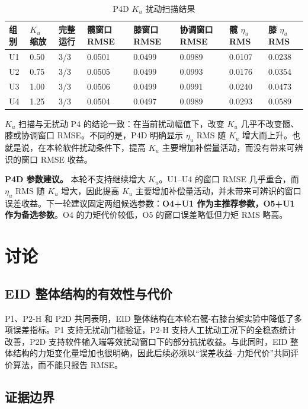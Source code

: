 \documentclass[12pt,a4paper]{ctexart}
\begin{document}
\begin{table}[htbp]
\centering
\footnotesize
\caption{P4D $K_u$ 扰动扫描结果}
\begin{tabularx}{\textwidth}{YYYYYYYY}
\toprule
组别 & $K_u$ 缩放 & 完整运行 & 髋窗口 RMSE & 膝窗口 RMSE & 协调窗口 RMSE & 髋 $\eta_u$ RMS & 膝 $\eta_u$ RMS \\
\midrule
U1 & 0.50 & 3/3 & 0.0501 & 0.0499 & 0.0989 & 0.0107 & 0.0238 \\
U2 & 0.75 & 3/3 & 0.0505 & 0.0499 & 0.0993 & 0.0176 & 0.0354 \\
U3 & 1.00 & 3/3 & 0.0506 & 0.0499 & 0.0991 & 0.0240 & 0.0473 \\
U4 & 1.25 & 3/3 & 0.0504 & 0.0497 & 0.0989 & 0.0293 & 0.0589 \\
\bottomrule
\end{tabularx}
\end{table}


$K_u$ 扫描与无扰动 P4 的结论一致：在当前扰动幅值下，改变 $K_u$ 几乎不改变髋、膝或协调窗口 RMSE。不同的是，P4D 明确显示 $\eta_u$ RMS 随 $K_u$ 增大而上升。也就是说，在本轮软件扰动条件下，提高 $K_u$ 主要增加补偿量活动，而没有带来可辨识的窗口 RMSE 收益。

\textbf{P4D 参数建议。} 本轮不支持继续增大 $K_u$。U1--U4 的窗口 RMSE 几乎重合，而 $\eta_u$ RMS 随 $K_u$ 增大，因此提高 $K_u$ 主要增加补偿量活动，并未带来可辨识的窗口误差收益。下一轮建议固定两组候选参数：\textbf{O4+U1 作为主推荐参数，O5+U1 作为备选参数}。O4 的力矩代价较低，O5 的窗口误差略低但力矩 RMS 略高。

\section{讨论}


\subsection{EID 整体结构的有效性与代价}


P1、P2-H 和 P2D 共同表明，EID 整体结构在本轮右髋-右膝台架实验中降低了多项误差指标。P1 支持无扰动门槛验证，P2-H 支持人工扰动工况下的全稳态统计改善，P2D 支持软件输入端等效扰动窗口下的部分抗扰收益。与此同时，EID 整体结构的力矩变化量增加也很明确，因此后续必须以“误差收益--力矩代价”共同评价算法，而不能只报告 RMSE。

\subsection{证据边界}
\end{document}
